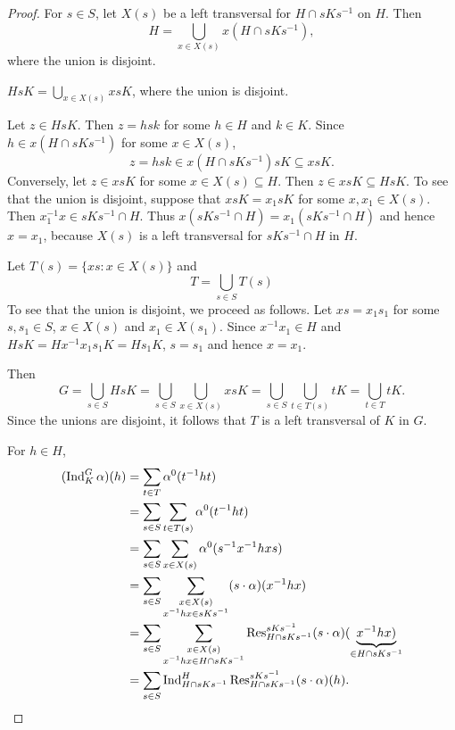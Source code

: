 \begin{proof}
    For $s\in S$, let $X(s)$ be a left transversal 
    for $H\cap sKs^{-1}$ on $H$. Then 
    \[
    H=\bigcup_{x\in X(s)}x(H\cap sKs^{-1}),
    \]
    where the union is disjoint. 

    \begin{claim}
        $HsK=\bigcup_{x\in X(s)}xsK$, where the union is disjoint.
    \end{claim} 
    
    Let $z\in HsK$. Then $z=hsk$ for some $h\in H$ and $k\in K$. Since $h\in x(H\cap sKs^{-1})$ 
    for some $x\in X(s)$, 
    \[
    z=hsk\in x(H\cap sKs^{-1})sK\subseteq xsK. 
    \]
    Conversely, let $z\in xsK$ for some $x\in X(s)\subseteq H$. Then $z\in xsK\subseteq HsK$. To see that the union is disjoint, 
    suppose that $xsK=x_1sK$ for some $x,x_1\in X(s)$. Then 
    $x_1^{-1}x\in sKs^{-1}\cap H$. Thus $x(sKs^{-1}\cap H)=x_1(sKs^{-1}\cap H)$ and hence $x=x_1$, because $X(s)$ 
    is a left transversal for $sKs^{-1}\cap H$ in $H$. 

    \bigskip 
    Let $T(s)=\{xs:x\in X(s)\}$ and 
    \[
    T=\bigcup_{s\in S}T(s)
    \]
    To see that the union is disjoint, we proceed as follows. 
    Let $xs=x_1s_1$ for some $s,s_1\in S$, $x\in X(s)$ and $x_1\in X(s_1)$. 
    Since $x^{-1}x_1\in H$ and 
    $HsK=Hx^{-1}x_1s_1K=Hs_1K$, $s=s_1$ and hence $x=x_1$. 

    Then
    \[
    G=\bigcup_{s\in S}HsK
    =\bigcup_{s\in S}\bigcup_{x\in X(s)}xsK
    =\bigcup_{s\in S}\bigcup_{t\in T(s)}tK
    =\bigcup_{t\in T}tK.
    \]
    Since the unions are disjoint, 
    it follows that $T$ is a left transversal of $K$ in $G$. 

    For $h\in H$, 
    \begin{align*}
        (\operatorname{Ind}_K^G\alpha)(h) &= \sum_{t\in T}\alpha^0(t^{-1}ht)\\
        &=\sum_{s\in S}\sum_{t\in T(s)}\alpha^0(t^{-1}ht)\\
        &=\sum_{s\in S}\sum_{x\in X(s)}\alpha^0(s^{-1}x^{-1}hxs)\\
        &=\sum_{s\in S}\sum_{\substack{x\in X(s)\\x^{-1}hx\in sKs^{-1}}}(s\cdot \alpha)(x^{-1}hx)\\
        &=\sum_{s\in S}\sum_{\substack{x\in X(s)\\x^{-1}hx\in H\cap sKs^{-1}}}\operatorname{Res}_{H\cap sKs^{-1}}^{sKs^{-1}}(s\cdot \alpha)(\underbrace{x^{-1}hx)}_{\in H\cap sKs^{-1}}\\
        &=\sum_{s\in S}\operatorname{Ind}_{H\cap sKs^{-1}}^H\operatorname{Res}_{H\cap sKs^{-1}}^{sKs^{-1}}(s\cdot \alpha)(h).\qedhere 
    \end{align*}
\end{proof}

